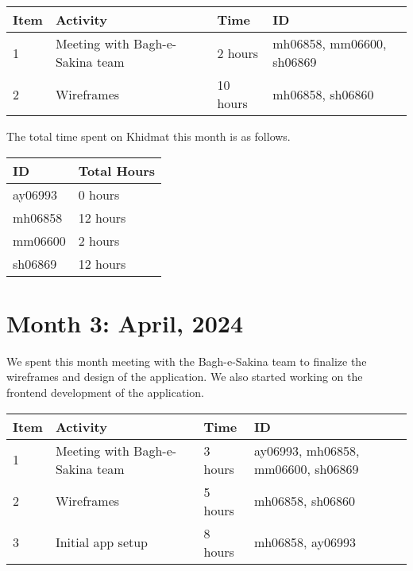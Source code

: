 \documentclass{article}
\begin{document}
\vspace{1em}

\noindent \begin{tabular}{|l|l|l|l|}
  \hline
  Item & Activity & Time   & ID                        \\\hline
  1    & Meeting with Bagh-e-Sakina team & 2 hours   & mh06858, mm06600, sh06869 \\\hline
  2    & Wireframes   & 10 hours & mh06858, sh06860          \\\hline
\end{tabular}

\vspace{1em}

\noindent The total time spent on Khidmat this month is as follows.

\vspace{1em}

\noindent \begin{tabular}{|l|l|}
  \hline
  ID      & Total Hours \\ \hline
  ay06993 & 0 hours     \\ \hline
  mh06858 & 12 hours    \\ \hline
  mm06600 & 2 hours     \\ \hline
  sh06869 & 12 hours    \\ \hline
\end{tabular}

\newpage %
\section*{Month 3: April, 2024}

We spent this month meeting with the Bagh-e-Sakina team to finalize the wireframes and design of the application. We also started working on the frontend development of the application.

\vspace{1em}

\noindent \begin{tabular}{|l|l|l|l|}
  \hline
  Item & Activity & Time & ID \\ \hline
  1 & Meeting with Bagh-e-Sakina team  & 3 hours & ay06993, mh06858, mm06600, sh06869 \\ \hline
  2 & Wireframes & 5 hours & mh06858, sh06860 \\ \hline
  3 & Initial app setup & 8 hours & mh06858, ay06993 \\ \hline
\end{tabular}
\end{document}
